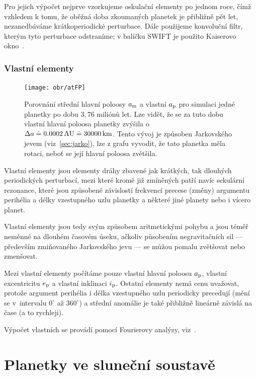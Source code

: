 \documentclass[A4paper, 12pt, oneside]{book}
\begin{document}
Pro jejich výpočet nejprve vzorkujeme oskulační elementy po jednom roce, čímž vzhledem k tomu, že oběžná doba zkoumaných planetek je přibližně pět let, nezanedbáváme krátkoperiodické perturbace. Dále použijeme konvoluční filtr, kterým tyto perturbace odstraníme; v balíčku SWIFT je použito Kaiserovo okno~\cite{quinn91}.

\subsection{Vlastní elementy}

\begin{figure}
	\centering
	\texttt{[image: obr/atFP]}
	\caption{Porovnání střední hlavní poloosy $a_{\rm m}$ a vlastní $a_{\rm p}$ pro simulaci jedné planetky po dobu $3,76$ miliónů let. Lze vidět, že se za tuto dobu vlastní hlavní poloosa planetky zvýšila o~$\Delta a\doteq0.0002\,{\rm AU}\doteq30000\, {\rm km}$. Tento vývoj je způsoben Jarkovského jevem (viz~\ref{sec:jarko}), lze z grafu vyvodit, že tato planetka měla  rotaci, neboť se její hlavní poloosa zvětšila.}
	\label{atFP}
\end{figure}

Vlastní elementy jsou elementy dráhy zbavené jak krátkých, tak dlouhých periodických perturbací, mezi které kromě již zmíněných patří navíc sekulární rezonance, které jsou způsobené závislostí frekvencí precese (změny) argumentu perihélia a délky vzestupného uzlu planetky a některé jiné planety nebo i vícero planet.

Vlastní elementy jsou tedy svým způsobem aritmetickými  pohybu a jsou téměř neměnné na dlouhém časovém úseku, ačkoliv působením negravitačních sil --- především zmiňovaného Jarkovského jevu --- se můžou pomalu zvětšovat nebo zmenšovat. 

Mezi vlastní elementy počítáme pouze vlastní hlavní poloosu $a_{\rm p}$, vlastní excentricitu $e_{\rm p}$ a vlastní inklinaci $i_{\rm p}$. Ostatní elementy nemá cenu uvažovat, protože argument perihélia i délka vzestupného uzlu periodicky precedují (mění se v~intervalu $0^\circ$ až $360^\circ$) a střední anomálie je také přibližně lineárně závislá na čase (a to rychleji).

Výpočet vlastních se provádí pomocí Fourierovy analýzy, viz~\cite{sidlichovsky96}. 

\chapter{Planetky ve sluneční soustavě} \label{ch:planetky}
\end{document}
